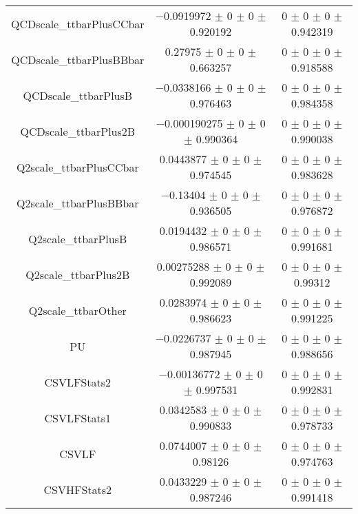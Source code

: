 \begin{table}
\begin{tabular}{ccc}
QCDscale\_ttbarPlusCCbar & \num{-0.0919972} $\pm$ \num{0} $\pm$ \num{0} $\pm$ \num{0.920192} & \num{0} $\pm$ \num{0} $\pm$ \num{0} $\pm$ \num{0.942319}\\
QCDscale\_ttbarPlusBBbar & \num{0.27975} $\pm$ \num{0} $\pm$ \num{0} $\pm$ \num{0.663257} & \num{0} $\pm$ \num{0} $\pm$ \num{0} $\pm$ \num{0.918588}\\
QCDscale\_ttbarPlusB & \num{-0.0338166} $\pm$ \num{0} $\pm$ \num{0} $\pm$ \num{0.976463} & \num{0} $\pm$ \num{0} $\pm$ \num{0} $\pm$ \num{0.984358}\\
QCDscale\_ttbarPlus2B & \num{-0.000190275} $\pm$ \num{0} $\pm$ \num{0} $\pm$ \num{0.990364} & \num{0} $\pm$ \num{0} $\pm$ \num{0} $\pm$ \num{0.990038}\\
Q2scale\_ttbarPlusCCbar & \num{0.0443877} $\pm$ \num{0} $\pm$ \num{0} $\pm$ \num{0.974545} & \num{0} $\pm$ \num{0} $\pm$ \num{0} $\pm$ \num{0.983628}\\
Q2scale\_ttbarPlusBBbar & \num{-0.13404} $\pm$ \num{0} $\pm$ \num{0} $\pm$ \num{0.936505} & \num{0} $\pm$ \num{0} $\pm$ \num{0} $\pm$ \num{0.976872}\\
Q2scale\_ttbarPlusB & \num{0.0194432} $\pm$ \num{0} $\pm$ \num{0} $\pm$ \num{0.986571} & \num{0} $\pm$ \num{0} $\pm$ \num{0} $\pm$ \num{0.991681}\\
Q2scale\_ttbarPlus2B & \num{0.00275288} $\pm$ \num{0} $\pm$ \num{0} $\pm$ \num{0.992089} & \num{0} $\pm$ \num{0} $\pm$ \num{0} $\pm$ \num{0.99312}\\
Q2scale\_ttbarOther & \num{0.0283974} $\pm$ \num{0} $\pm$ \num{0} $\pm$ \num{0.986623} & \num{0} $\pm$ \num{0} $\pm$ \num{0} $\pm$ \num{0.991225}\\
PU & \num{-0.0226737} $\pm$ \num{0} $\pm$ \num{0} $\pm$ \num{0.987945} & \num{0} $\pm$ \num{0} $\pm$ \num{0} $\pm$ \num{0.988656}\\
CSVLFStats2 & \num{-0.00136772} $\pm$ \num{0} $\pm$ \num{0} $\pm$ \num{0.997531} & \num{0} $\pm$ \num{0} $\pm$ \num{0} $\pm$ \num{0.992831}\\
CSVLFStats1 & \num{0.0342583} $\pm$ \num{0} $\pm$ \num{0} $\pm$ \num{0.990833} & \num{0} $\pm$ \num{0} $\pm$ \num{0} $\pm$ \num{0.978733}\\
CSVLF & \num{0.0744007} $\pm$ \num{0} $\pm$ \num{0} $\pm$ \num{0.98126} & \num{0} $\pm$ \num{0} $\pm$ \num{0} $\pm$ \num{0.974763}\\
CSVHFStats2 & \num{0.0433229} $\pm$ \num{0} $\pm$ \num{0} $\pm$ \num{0.987246} & \num{0} $\pm$ \num{0} $\pm$ \num{0} $\pm$ \num{0.991418}\\

\end{tabular}
\end{table}
